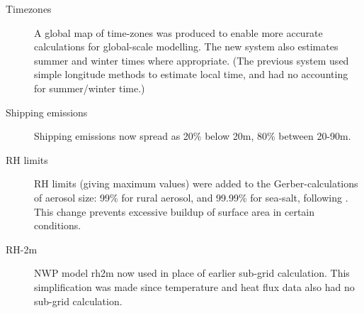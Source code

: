 \begin{description}
  \item[Timezones] A global map of time-zones was produced to enable more accurate calculations for global-scale modelling. The new system also estimates summer and winter times where appropriate. (The previous system used simple longitude methods to estimate local time, and had no accounting for summer/winter time.) 
  
  \item[Shipping emissions] Shipping emissions now spread as 20\% below 20m, 80\% between 20-90m. 
  
    \item[RH limits] RH limits (giving maximum values) were added to the Gerber-calculations of aerosol size: 99\% for rural aerosol, and 99.99\% for sea-salt, following \citet{Gerber1985}. This change prevents excessive buildup of surface area in certain conditions.
    
  \item[RH-2m] NWP model rh2m now used in place of earlier sub-grid calculation. This simplification was made since temperature and heat flux data also had no sub-grid calculation. %
\end{description}



